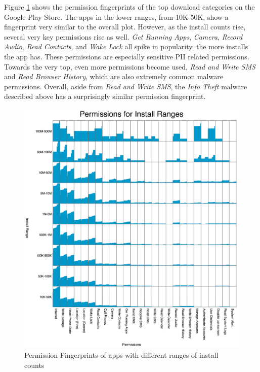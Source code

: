 

Figure \ref{fig:topappsfingerprint} shows the permission fingerprints of the top download categories on the Google Play Store. The apps in the lower ranges, from 10K-50K, show a fingerprint very similar to the overall plot. However, as the install counts rise, several very key permissions rise as well. \textit{Get Running Apps}, \textit{Camera}, \textit{Record Audio}, \textit{Read Contacts}, and \textit{Wake Lock} all spike in popularity, the more installs the app has. These permissions are especially sensitive PII related permissions. Towards the very top, even more permissions become used, \textit{Read and Write SMS} and \textit{Read Browser History}, which are also extremely common malware permissions. Overall, aside from \textit{Read and Write SMS}, the \textit{Info Theft} malware described above has a surprisingly similar permission fingerprint.

\begin{figure}[h]
\begin{center}
\includegraphics[width=1.0\columnwidth]{figs/PermissionsforInstallRanges}
\caption{Permission Fingerprints of apps with different ranges of install counts}
\label{fig:topappsfingerprint}
\end{center}
\end{figure}



